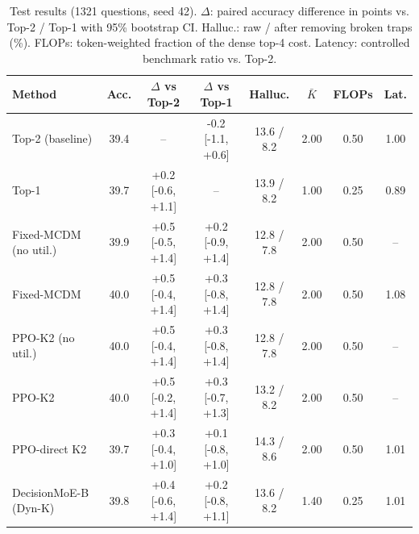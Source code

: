 \begin{table}[t]
\centering
\small
\begin{tabular}{lccccccc}
\toprule
Method & Acc. & $\Delta$ vs Top-2 & $\Delta$ vs Top-1 & Halluc. & $\bar K$ & FLOPs & Lat. \\
\midrule
Top-2 (baseline) & 39.4 & -- & -0.2 [-1.1, +0.6] & 13.6 / 8.2 & 2.00 & 0.50 & 1.00 \\
Top-1 & 39.7 & +0.2 [-0.6, +1.1] & -- & 13.9 / 8.2 & 1.00 & 0.25 & 0.89 \\
Fixed-MCDM (no util.) & 39.9 & +0.5 [-0.5, +1.4] & +0.2 [-0.9, +1.4] & 12.8 / 7.8 & 2.00 & 0.50 & -- \\
Fixed-MCDM & 40.0 & +0.5 [-0.4, +1.4] & +0.3 [-0.8, +1.4] & 12.8 / 7.8 & 2.00 & 0.50 & 1.08 \\
PPO-K2 (no util.) & 40.0 & +0.5 [-0.4, +1.4] & +0.3 [-0.8, +1.4] & 12.8 / 7.8 & 2.00 & 0.50 & -- \\
PPO-K2 & 40.0 & +0.5 [-0.2, +1.4] & +0.3 [-0.7, +1.3] & 13.2 / 8.2 & 2.00 & 0.50 & -- \\
PPO-direct K2 & 39.7 & +0.3 [-0.4, +1.0] & +0.1 [-0.8, +1.0] & 14.3 / 8.6 & 2.00 & 0.50 & 1.01 \\
DecisionMoE-B (Dyn-K) & 39.8 & +0.4 [-0.6, +1.4] & +0.2 [-0.8, +1.1] & 13.6 / 8.2 & 1.40 & 0.25 & 1.01 \\
\bottomrule
\end{tabular}
\caption{Test results (1321 questions, seed 42). $\Delta$: paired accuracy difference in points vs. Top-2 / Top-1 with 95\% bootstrap CI. Halluc.: raw / after removing broken traps (\%). FLOPs: token-weighted fraction of the dense top-4 cost. Latency: controlled benchmark ratio vs. Top-2.}
\label{tab:main}
\end{table}
